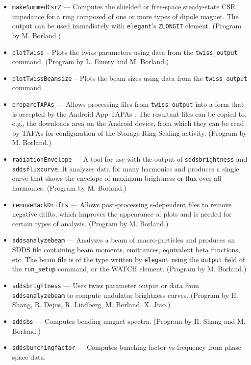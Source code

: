 \documentclass[11pt]{article}
\begin{document}
\begin{itemize}
  bunch lengthening and output these to a file that can be use with \verb|load_parameters|.
  (Program by M. Borland.)
\item {\tt makeSummedCsrZ} --- Computes the shielded or free-space steady-state CSR impedance for a ring
  composed of one or more types of dipole magnet.
 The output can be used immediately with {\tt elegant}'s \verb|ZLONGIT| element.
  (Program by M. Borland.)
\item {\tt plotTwiss} -- Plots the twiss parameters using data from the \verb|twiss_output| command.
  (Program by L. Emery and M. Borland.)
\item {\tt plotTwissBeamsize} -- Plots the beam sizes using data from the \verb|twiss_output| command.
\item {\tt prepareTAPAs} --- Allows processing files from \verb|twiss_output| into a form
  that is accepted by the Android App TAPAs \cite{TAPAs}. The resultant files can be copied to, e.g., 
  the downloads area on the Android device, from which they can be read by TAPAs for configuration of
  the Storage Ring Scaling activity.
  (Program by M. Borland.)
\item {\tt radiationEnvelope} --- A tool for use with the output of {\tt sddsbrightness} and {\tt sddsfluxcurve}.
  It analyzes data for many harmonics and produces a single curve that shows the envelope of maximum
  brightness or flux over all harmonics.
  (Program by M. Borland.)
\item {\tt removeBackDrifts} --- Allows post-processing s-dependent files to remove negative drifts, which
  improves the appearance of plots and is needed for certain types of analysis.
  (Program by M. Borland.)
\item {\tt sddsanalyzebeam} --- Analyzes a beam of macro-particles and produces an SDDS file
        containing beam moments, emittances, equivalent beta functions, etc.  The beam file
        is of the type written by {\tt elegant} using the {\tt output} field of the {\tt run\_setup}
        command, or the WATCH element.  (Program by M. Borland.)
\item {\tt sddsbrightness} --- Uses twiss parameter output or data from {\tt sddsanalyzebeam} to
  compute undulator brightness curves.  (Program by H. Shang, R. Dejus, R. Lindberg, M. Borland, X. Jiao.)
\item {\tt sddsbs} --- Computes bending magnet spectra.
  (Program by H. Shang and M. Borland.)
\item {\tt sddsbunchingfactor} --- Computes bunching factor vs frequency from phase space data.

\end{itemize}
\end{document}
